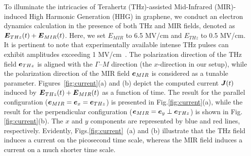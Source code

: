To illuminate the intricacies of Terahertz (THz)-assisted Mid-Infrared (MIR)-induced High Harmonic Generation (HHG) in graphene, we conduct an electron dynamics calculation in the presence of both THz and MIR fields, denoted as $\boldsymbol E_{THz}(t) + \boldsymbol E_{MIR}(t)$. Here, we set $E_{MIR}$ to 6.5 MV/cm and $E_{THz}$ to 0.5 MV/cm. It is pertinent to note that experimentally available intense THz pulses can exhibit amplitudes exceeding 1 MV/cm~\cite{10.1063/1.3560062}. The polarization direction of the THz field $\boldsymbol e_{THz}$ is aligned with the $\Gamma$--$M$ direction (the $x$-direction in our setup), while the polarization direction of the MIR field $\boldsymbol e_{MIR}$ is considered as a tunable parameter. Figures~\ref{fig:current}(a) and (b) depict the computed current $\boldsymbol J(t)$ induced by $\boldsymbol E_{THz}(t) + \boldsymbol E_{MIR}(t)$ as a function of time. The result for the parallel configuration ($\boldsymbol e_{MIR} = \boldsymbol e_x = \boldsymbol e_{THz}$) is presented in Fig.\ref{fig:current}(a), while the result for the perpendicular configuration ($\boldsymbol e_{MIR} = \boldsymbol e_y \perp \boldsymbol e_{THz}$) is shown in Fig.\ref{fig:current}(b). The $x$ and $y$ components are represented by blue and red lines, respectively. Evidently, Figs.\ref{fig:current}~(a) and (b) illustrate that the THz field induces a current on the picosecond time scale, whereas the MIR field induces a current on a much shorter time scale.
